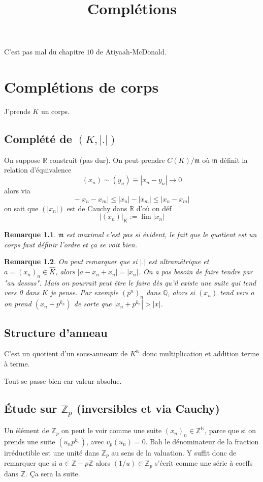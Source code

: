 \documentclass[a4paper,12pt]{book}
\title{Complétions}
\date{}
\newcommand{\Z}{\mathbb{Z}}
\newcommand{\R}{\mathbb{R}}
\newcommand{\Q}{\mathbb{Q}}
\newcommand{\N}{\mathbb{N}}
\newcommand{\m}{\mathfrak m}
\theoremstyle{plain}
\newtheorem{rem}{Remarque}
\theoremstyle{definition}
\theoremstyle{remark}
\begin{document}
\maketitle

C'est pas mal du chapitre $10$ de Atiyaah-McDonald.

\chapter{Complétions de corps}
J'prends $K$ un corps.
\section{Complété de $(K,|.|)$}
On suppose $\R$ construit (pas dur).
On peut prendre $C(K)/\m$ où $\m$ définit
la relation d'équivalence
\[(x_n)\sim (y_n)\equiv |x_n-y_n|\to 0\]
alors via 
\[-|x_n-x_m|\leq |x_n|-|x_m|\leq |x_n-x_m|\]
on sait que $(|x_n|)$ est de Cauchy dans $\R$
d'où on déf 
\[|(x_n)|_{\hat K} := \lim |x_n|\]

\begin{rem}
    $\m$ est maximal c'est pas si évident,
    le fait que le quotient est un corps faut
    définir l'ordre et ça se voit bien.
\end{rem}

\begin{rem}
    On peut remarquer que si $|.|$ est ultramétrique et
    $a=(x_n)_n\in \hat K$, alors $|a-x_n+x_n|=|x_n|$. On a pas 
    besoin de faire tendre par "au dessus". Mais on pourrait peut
    être le faire dès qu'il existe 
    une suite qui tend vers 0 dans $K$ je pense. Par exemple
    $(p^n)_n$ dans $\Q$, alors si $(x_n)$ tend vers $a$ on prend
    $(x_n+p^{k_n})$ de sorte que $|x_n+p^{k_n}|>|x|$.
\end{rem}

\section{Structure d'anneau}
C'est un quotient d'un sous-anneaux de
$K^\N$ donc multiplication et addition terme à terme.
\begin{rm}
    Tout se passe bien car valeur absolue.
\end{rm}
\section{Étude sur $\Z_p$ (inversibles et via Cauchy)}
Un élément de $\Z_p$ on peut le voir comme une suite 
$(x_n)_n\in \Z^\N$, parce que si on prends une suite
$(u_np^{k_n})$, avec $v_p(u_n)=0$. Bah le dénominateur
de la fraction irréductible est une unité dans $\Z_p$
au sens de la valuation.
Y suffit donc de remarquer que si $u\in \Z-p\Z$ alors
$(1/u)\in \Z_p$ s'écrit comme une série à coeffs
dans $\Z$. Ça sera la suite.
\end{document}
